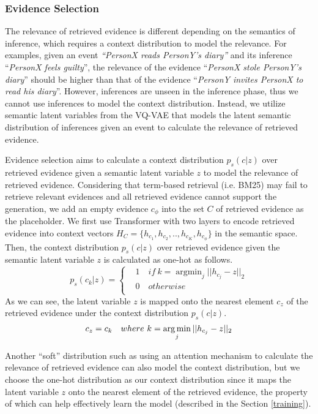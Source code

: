 \documentclass[11pt,a4paper]{article}
\begin{document}
\subsubsection{Evidence Selection}
The relevance of retrieved evidence is different depending on the semantics of inference, which requires a context distribution to model the relevance. For examples, given an event \textit{``PersonX reads PersonY's diary''} and its inference ``\textit{PersonX feels guilty}'', the relevance of the evidence ``\textit{PersonX stole PersonY's diary}'' should be higher than that of the evidence   ``\textit{PersonY invites PersonX to read his diary}''.
However, inferences are unseen in the inference phase, thus we cannot use inferences to model the context distribution.
Instead, we \mbox{utilize} semantic latent variables from the VQ-VAE that models the latent semantic distribution of inferences given an event to calculate the relevance of retrieved evidence. 


Evidence selection aims to calculate a context distribution $p_s(c|z)$ over retrieved evidence given a semantic latent variable $z$ to model the relevance of retrieved evidence. 
Considering that term-based retrieval (i.e. BM25) may fail to retrieve relevant evidences and all retrieved evidence cannot support the generation, we add an empty evidence $c_\phi$ into the set $C$ of retrieved evidence as the placeholder. We first use Transformer with two layers to encode retrieved evidence into context vectors $H_C=\{h_{c_1},h_{c_2},..,h_{c_K},h_{c_\phi}\}$ in the semantic space.  Then, the context distribution $p_s(c|z)$ over retrieved evidence given the semantic latent variable $z$ is calculated as one-hot as follows.
\begin{equation}\label{p(c_k|z)}
p_s(c_k|z)=\left\{
\begin{aligned}
& 1\quad\!\!\! if\ k=\mathop{\arg\min}_{j}||h_{c_j}-z||_2 \\
& 0\quad\!\!\! otherwise \\
\end{aligned}
\right.
\end{equation}
As we can see, the latent variable $z$ is mapped onto the nearest element $c_{z}$ of the retrieved evidence under the context distribution $p_s(c|z)$.
\begin{equation}\label{c_{z}}
c_{z}=c_k\quad where\  k=\mathop{\arg\min}_{j}||h_{c_j}-z||_2
\end{equation}

Another ``soft'' distribution such as using an attention mechanism to calculate the relevance of retrieved evidence can also model the context distribution, but we choose the one-hot distribution as our context distribution since it maps the latent variable $z$ onto the nearest element of the retrieved evidence, the property of which can help effectively learn the model (described in the Section \ref{training}). 
\end{document}
